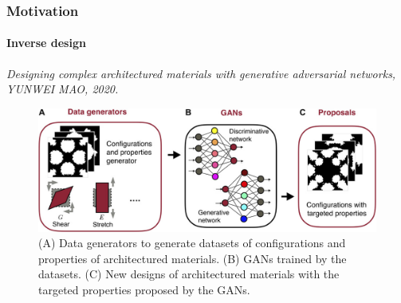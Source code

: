 \documentclass[
	10pt, %
]{beamer}
\begin{document}
\begin{frame}
	\frametitle{Motivation}
	\framesubtitle{Inverse design}
	\textit{Designing complex architectured materials with generative adversarial networks, YUNWEI MAO, 2020.}
	\begin{figure}
		\includegraphics[width=0.8\linewidth]{figures/ML_procedure.jpeg}
		\caption{(A) Data generators to generate datasets of configurations and properties of architectured materials. (B) GANs trained by the datasets. (C) New designs of architectured materials with the targeted properties proposed by the GANs.}
	\end{figure}	

\end{frame}






\end{document}
